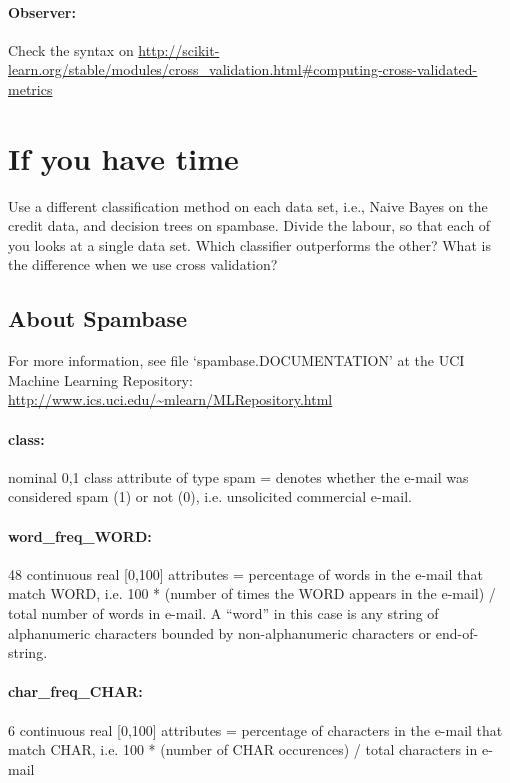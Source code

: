 \documentclass{article}
\begin{document}
\paragraph{Observer:} Check the syntax on \url{http://scikit-learn.org/stable/modules/cross_validation.html#computing-cross-validated-metrics}

\section{If you have time}

Use a different classification method on each data set, i.e., Naive Bayes on the credit data, and decision trees on spambase. Divide the labour, so that each of you looks at a single data set. Which classifier outperforms the other? What is the difference when we use cross validation? 



\begin{appendix}
	
	\section{About Spambase}\label{app:spambase}
	
	For more information, see file `spambase.DOCUMENTATION' at the
	UCI Machine Learning Repository: \url{http://www.ics.uci.edu/~mlearn/MLRepository.html}
	
	\paragraph{class:} nominal {0,1} class attribute of type spam
	= denotes whether the e-mail was considered spam (1) or not (0), 
	i.e. unsolicited commercial e-mail.  
	\paragraph{word\_freq\_WORD:} 
    48 continuous real [0,100] attributes
	= percentage of words in the e-mail that match WORD,
	i.e. 100 * (number of times the WORD appears in the e-mail) / 
	total number of words in e-mail.  A ``word'' in this case is any 
	string of alphanumeric characters bounded by non-alphanumeric 
	characters or end-of-string.
	
	\paragraph{char\_freq\_CHAR:} 6 continuous real [0,100] attributes 
	= percentage of characters in the e-mail that match CHAR,
	i.e. 100 * (number of CHAR occurences) / total characters in e-mail
	
\end{appendix}
	
	
	

	
\end{document}
